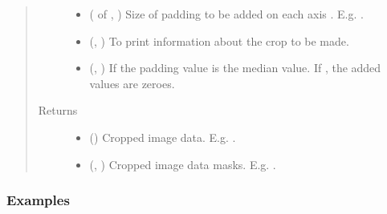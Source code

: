 \documentclass[letterpaper,10pt,english]{sphinxmanual}
\begin{document}
\begin{fulllineitems}
\begin{quote}
\begin{description}
\begin{itemize}
\item {} 
 ( of , ) \textendash{} Size of padding to be added on each axis . E.g. .

\item {} 
 (, ) \textendash{} To print information about the crop to be made.

\item {} 
 (, ) \textendash{} If  the padding value is the median value. If , the added values are zeroes.

\end{itemize}

\item[{Returns}] \leavevmode
\begin{itemize}
\item {} 
 () \textendash{} Cropped image data. E.g. .

\item {} 
 (, ) \textendash{} Cropped image data masks. E.g. .

\end{itemize}


\end{description}\end{quote}
\subsubsection*{Examples}


\end{fulllineitems}
\end{document}
